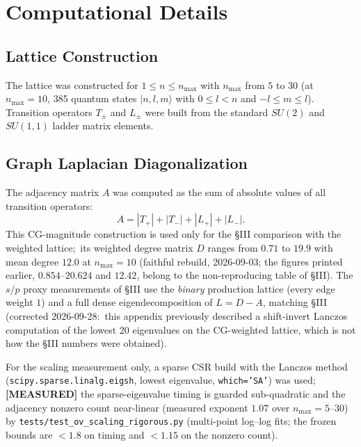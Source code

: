 \documentclass[aps,pra,twocolumn,superscriptaddress,longbibliography]{revtex4-2}
\begin{document}
\section{Computational Details}

\subsection{Lattice Construction}

The lattice was constructed for $1 \leq n \leq n_{\max}$ with $n_{\max}$ from $5$ to $30$ (at $n_{\max} = 10$, 385 quantum states $|n, l, m\rangle$ with $0 \leq l < n$ and $-l \leq m \leq l$). Transition operators $T_\pm$ and $L_\pm$ were built from the standard $SU(2)$ and $SU(1,1)$ ladder matrix elements.

\subsection{Graph Laplacian Diagonalization}

The adjacency matrix $A$ was computed as the sum of absolute values of all transition operators:
\begin{equation}
A = |T_+| + |T_-| + |L_+| + |L_-|.
\end{equation}
This CG-magnitude construction is used only for the \S III comparison with the weighted lattice;\ its weighted degree matrix $D$ ranges from $0.71$ to $19.9$ with mean degree $12.0$ at $n_{\max} = 10$ (faithful rebuild, 2026-09-03; the figures printed earlier, $0.854$--$20.624$ and $12.42$, belong to the non-reproducing table of \S III).  The $s/p$ proxy measurements of \S III use the \emph{binary} production lattice (every edge weight $1$) and a full dense eigendecomposition of $L = D - A$, matching \S III (corrected 2026-09-28:\ this appendix previously described a shift-invert Lanczos computation of the lowest 20 eigenvalues on the CG-weighted lattice, which is not how the \S III numbers were obtained).

For the scaling measurement only, a sparse CSR build with the Lanczos method (\texttt{scipy.sparse.linalg.eigsh}, lowest eigenvalue, \texttt{which='SA'}) was used; \textbf{[MEASURED]} the sparse-eigenvalue timing is guarded sub-quadratic and the adjacency nonzero count near-linear (measured exponent $1.07$ over $n_{\max} = 5$--$30$) by \texttt{tests/test\_ov\_scaling\_rigorous.py} (multi-point log--log fits; the frozen bounds are $< 1.8$ on timing and $< 1.15$ on the nonzero count).
\end{document}
